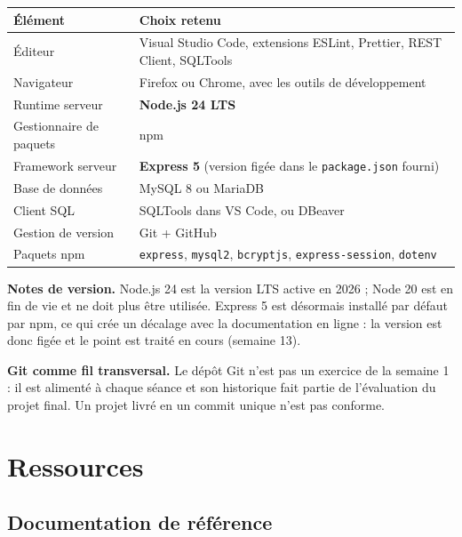 \documentclass[a4paper,11pt]{article}
\begin{document}
\begin{center}
\begin{tabularx}{\linewidth}{lX}
  \toprule
  \rowcolor{accentBlue}
  \color{white}\textbf{Élément} &
  \color{white}\textbf{Choix retenu} \\
  \midrule
  \rowcolor{cfptGrey}
  Éditeur & Visual Studio Code, extensions ESLint, Prettier, REST Client, SQLTools \\
  Navigateur & Firefox ou Chrome, avec les outils de développement \\
  \rowcolor{cfptGrey}
  Runtime serveur & \textbf{Node.js 24 LTS} \\
  Gestionnaire de paquets & npm \\
  \rowcolor{cfptGrey}
  Framework serveur & \textbf{Express 5} (version figée dans le \texttt{package.json} fourni) \\
  Base de données & MySQL 8 ou MariaDB \\
  \rowcolor{cfptGrey}
  Client SQL & SQLTools dans VS Code, ou DBeaver \\
  Gestion de version & Git + GitHub \\
  \rowcolor{cfptGrey}
  Paquets npm & \texttt{express}, \texttt{mysql2}, \texttt{bcryptjs}, \texttt{express-session}, \texttt{dotenv} \\
  \bottomrule
\end{tabularx}
\end{center}

\medskip
\noindent\textbf{Notes de version.} Node.js 24 est la version LTS active en 2026 ; Node 20 est en fin de vie et ne doit plus être utilisée. Express 5 est désormais installé par défaut par npm, ce qui crée un décalage avec la documentation en ligne : la version est donc figée et le point est traité en cours (semaine 13).

\medskip
\noindent\textbf{Git comme fil transversal.} Le dépôt Git n'est pas un exercice de la semaine 1 : il est alimenté à chaque séance et son historique fait partie de l'évaluation du projet final. Un projet livré en un commit unique n'est pas conforme.

\section{Ressources}

\subsection{Documentation de référence}
\end{document}
